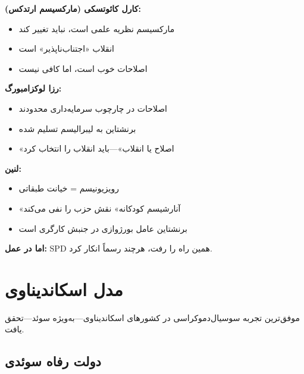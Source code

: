 \begin{debatebox}
\textbf{کارل کائوتسکی (مارکسیسم ارتدکس):}
\begin{itemize}[nosep]
    \item مارکسیسم نظریه علمی است، نباید تغییر کند
    \item انقلاب «اجتناب‌ناپذیر» است
    \item اصلاحات خوب است، اما کافی نیست
\end{itemize}

\textbf{رزا لوکزامبورگ:}
\begin{itemize}[nosep]
    \item اصلاحات در چارچوب سرمایه‌داری محدودند
    \item برنشتاین به لیبرالیسم تسلیم شده
    \item «اصلاح یا انقلاب»—باید انقلاب را انتخاب کرد
\end{itemize}

\textbf{لنین:}
\begin{itemize}[nosep]
    \item رویزیونیسم = خیانت طبقاتی
    \item «آنارشیسم کودکانه» نقش حزب را نفی می‌کند
    \item برنشتاین عامل بورژوازی در جنبش کارگری است
\end{itemize}

\textbf{اما در عمل:} SPD همین راه را رفت، هرچند رسماً انکار کرد.
\end{debatebox}

\section{مدل اسکاندیناوی}

موفق‌ترین تجربه سوسیال‌دموکراسی در کشورهای اسکاندیناوی—به‌ویژه سوئد—تحقق یافت.

\subsection{دولت رفاه سوئدی}

